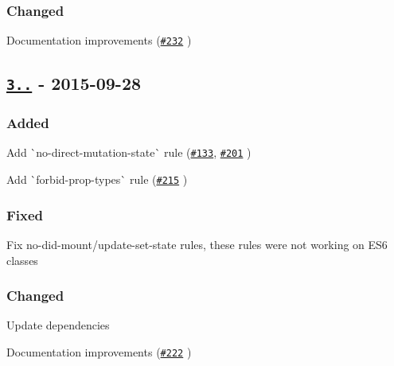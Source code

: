 \subsubsection*{Changed}


\begin{DoxyItemize}
\item Documentation improvements (\href{https://github.com/yannickcr/eslint-plugin-react/pull/232}{\tt \#232} )
\end{DoxyItemize}

\subsection*{\href{https://github.com/yannickcr/eslint-plugin-react/compare/v3.4.2...v3.5.0}{\tt 3..} -\/ 2015-\/09-\/28}

\subsubsection*{Added}


\begin{DoxyItemize}
\item Add \`{}no-\/direct-\/mutation-\/state\`{} rule (\href{https://github.com/yannickcr/eslint-plugin-react/issues/133}{\tt \#133}, \href{https://github.com/yannickcr/eslint-plugin-react/issues/201}{\tt \#201} )
\item Add \`{}forbid-\/prop-\/types\`{} rule (\href{https://github.com/yannickcr/eslint-plugin-react/issues/215}{\tt \#215} )
\end{DoxyItemize}

\subsubsection*{Fixed}


\begin{DoxyItemize}
\item Fix no-\/did-\/mount/update-\/set-\/state rules, these rules were not working on E\+S6 classes
\end{DoxyItemize}

\subsubsection*{Changed}


\begin{DoxyItemize}
\item Update dependencies
\item Documentation improvements (\href{https://github.com/yannickcr/eslint-plugin-react/pull/222}{\tt \#222} )
\end{DoxyItemize}

